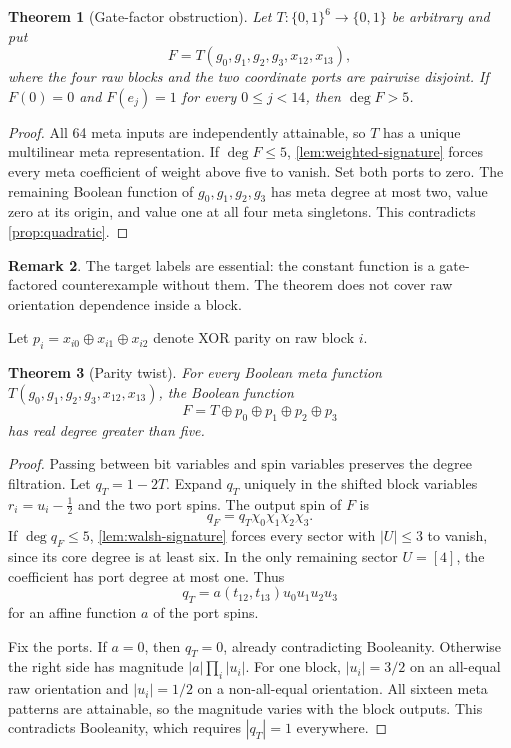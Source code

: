 \documentclass[11pt]{article}
\newtheorem{theorem}{Theorem}[section]
\theoremstyle{definition}
\newtheorem{remark}[theorem]{Remark}
\newcommand{\cube}[1]{\{0,1\}^{#1}}
\begin{document}
\begin{theorem}[Gate-factor obstruction]\label{thm:gate-factor}
Let \(T:\cube6\to\{0,1\}\) be arbitrary and put
\[
 F=T(g_0,g_1,g_2,g_3,x_{12},x_{13}),
\]
where the four raw blocks and the two coordinate ports are pairwise disjoint.
If \(F(0)=0\) and \(F(e_j)=1\) for every \(0\le j<14\), then
\(\deg F>5\).
\end{theorem}

\begin{proof}
All 64 meta inputs are independently attainable, so \(T\) has a unique
multilinear meta representation.  If \(\deg F\le5\),
\cref{lem:weighted-signature} forces every meta coefficient of weight above
five to vanish.  Set both ports to zero.  The remaining Boolean function of
\(g_0,g_1,g_2,g_3\) has meta degree at most two, value zero at its origin, and
value one at all four meta singletons.  This contradicts
\cref{prop:quadratic}.
\end{proof}

\begin{remark}
The target labels are essential: the constant function is a gate-factored
counterexample without them.  The theorem does not cover raw orientation
dependence inside a block.
\end{remark}

Let \(p_i=x_{i0}\oplus x_{i1}\oplus x_{i2}\) denote XOR parity on raw block
\(i\).

\begin{theorem}[Parity twist]\label{thm:parity-twist}
For every Boolean meta function
\(T(g_0,g_1,g_2,g_3,x_{12},x_{13})\), the Boolean function
\[
 F=T\oplus p_0\oplus p_1\oplus p_2\oplus p_3
\]
has real degree greater than five.
\end{theorem}

\begin{proof}
Passing between bit variables and spin variables preserves the degree
filtration.  Let \(q_T=1-2T\).  Expand \(q_T\) uniquely in the shifted block
variables \(r_i=u_i-\tfrac12\) and the two port spins.  The output spin of
\(F\) is
\[
 q_F=q_T\chi_0\chi_1\chi_2\chi_3.
\]
If \(\deg q_F\le5\), \cref{lem:walsh-signature} forces every sector with
\(|U|\le3\) to vanish, since its core degree is at least six.  In the only
remaining sector \(U=[4]\), the coefficient has port degree at most one.
Thus
\[
 q_T=a(t_{12},t_{13})u_0u_1u_2u_3
\]
for an affine function \(a\) of the port spins.

Fix the ports.  If \(a=0\), then \(q_T=0\), already contradicting Booleanity.
Otherwise the right side has magnitude \(|a|\prod_i|u_i|\).  For one block,
\(|u_i|=3/2\) on an all-equal raw
orientation and \(|u_i|=1/2\) on a non-all-equal orientation.  All sixteen
meta patterns are attainable, so the magnitude varies with the block outputs.
This contradicts Booleanity, which requires \(|q_T|=1\) everywhere.
\end{proof}
\end{document}
